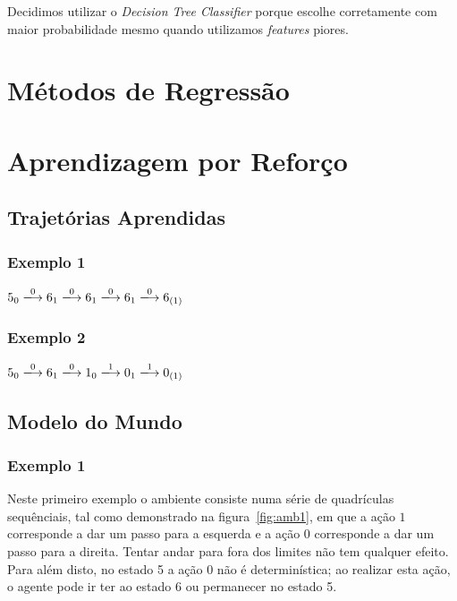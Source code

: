 \documentclass[a4paper,twocolumn]{article}
\begin{document}
    Decidimos utilizar o \textit{Decision Tree Classifier} porque escolhe corretamente com maior probabilidade mesmo quando
    utilizamos \textit{features} piores.

    \section{Métodos de Regressão}

    \section{Aprendizagem por Reforço}
    \subsection{Trajetórias Aprendidas}
    \subsubsection{Exemplo 1}
    $ 5_0 \xlongrightarrow{0} 6_1 \xlongrightarrow{0} 6_1 \xlongrightarrow{0} 6_1 \xlongrightarrow{0} 6_{(1)} $

    \subsubsection{Exemplo 2}
    $ 5_0 \xlongrightarrow{0} 6_1 \xlongrightarrow{0} 1_0 \xlongrightarrow{1} 0_1 \xlongrightarrow{1} 0_{(1)} $


    \subsection{Modelo do Mundo}
    \subsubsection{Exemplo 1}
    Neste primeiro exemplo o ambiente consiste numa série de quadrículas sequênciais, tal como demonstrado na
    figura~\ref{fig:amb1}, em que a ação $1$ corresponde a dar um passo para a esquerda e a ação $0$ corresponde a
    dar um passo para a direita. Tentar andar para fora dos limites não tem qualquer efeito.
    Para além disto, no estado 5 a ação 0 não é determinística; ao realizar esta ação, o agente pode ir ter ao estado
    6 ou permanecer no estado 5.
\end{document}
